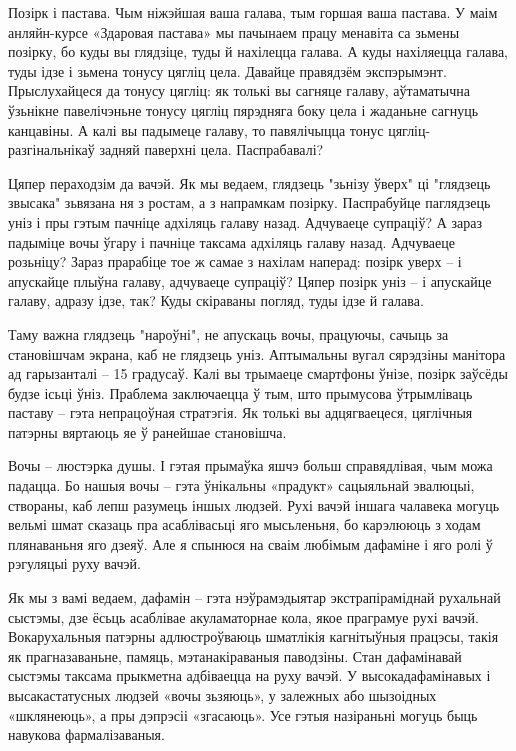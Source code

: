 Позірк і пастава. Чым ніжэйшая ваша галава, тым горшая ваша пастава. У маім анляйн-курсе «Здаровая пастава» мы пачынаем працу менавіта са зьмены позірку, бо куды вы глядзіце, туды й нахілецца галава. А куды нахіляецца галава, туды ідзе і зьмена тонусу цягліц цела. Давайце правядзём экспэрымэнт. Прыслухайцеся да тонусу цягліц: як толькі вы сагняце галаву, аўтаматычна ўзьнікне павелічэньне тонусу цягліц пярэдняга боку цела і жаданьне сагнуць канцавіны. А калі вы падымеце галаву, то павялічыцца тонус цягліц-разгінальнікаў задняй паверхні цела. Паспрабавалі?

Цяпер пераходзім да вачэй. Як мы ведаем, глядзець "зьнізу ўверх" ці "глядзець звысака" зьвязана ня з ростам, а з напрамкам позірку. Паспрабуйце паглядзець уніз і пры гэтым пачніце адхіляць галаву назад. Адчуваеце супраціў? А зараз падыміце вочы ўгару і пачніце таксама адхіляць галаву назад. Адчуваеце розьніцу? Зараз прарабіце тое ж самае з нахілам наперад: позірк уверх – і апускайце плыўна галаву, адчуваеце супраціў? Цяпер позірк уніз – і апускайце галаву, адразу ідзе, так? Куды скіраваны погляд, туды ідзе й галава.

Таму важна глядзець "нароўні", не апускаць вочы, працуючы, сачыць за становішчам экрана, каб не глядзець уніз. Аптымальны вугал сярэдзіны манітора ад гарызанталі – 15 градусаў. Калі вы трымаеце смартфоны ўнізе, позірк заўсёды будзе ісьці ўніз. Праблема заключаецца ў тым, што прымусова ўтрымліваць паставу – гэта непрацоўная стратэгія. Як толькі вы адцягваецеся, цяглічныя патэрны вяртаюць яе ў ранейшае становішча.

Вочы – люстэрка душы. І гэтая прымаўка яшчэ больш справядлівая, чым можа падацца. Бо нашыя вочы – гэта ўнікальны «прадукт» сацыяльнай эвалюцыі, створаны, каб лепш разумець іншых людзей. Рухі вачэй іншага чалавека могуць вельмі шмат сказаць пра асаблівасьці яго мысьленьня, бо карэлююць з ходам плянаваньня яго дзеяў. Але я спынюся на сваім любімым дафаміне і яго ролі ў рэгуляцыі руху вачэй.

Як мы з вамі ведаем, дафамін – гэта нэўрамэдыятар экстрапіраміднай рухальнай сыстэмы, дзе ёсьць асаблівае акуламаторнае кола, якое праграмуе рухі вачэй. Вокарухальныя патэрны адлюстроўваюць шматлікія кагнітыўныя працэсы, такія як прагназаваньне, памяць, мэтанакіраваныя паводзіны. Стан дафамінавай сыстэмы таксама прыкметна адбіваецца на руху вачэй. У высокадафамінавых і высакастатусных людзей «вочы зьзяюць», у залежных або шызоідных «шклянеюць», а пры дэпрэсіі «згасаюць». Усе гэтыя назіраньні могуць быць навукова фармалізаваныя.

